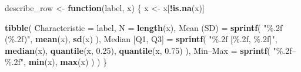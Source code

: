 \documentclass[
]{article}
\newenvironment{Shaded}{\begin{snugshade}}{\end{snugshade}}
\newcommand{\AttributeTok}[1]{\textcolor[rgb]{0.13,0.29,0.53}{#1}}
\newcommand{\ControlFlowTok}[1]{\textcolor[rgb]{0.13,0.29,0.53}{\textbf{#1}}}
\newcommand{\FloatTok}[1]{\textcolor[rgb]{0.00,0.00,0.81}{#1}}
\newcommand{\FunctionTok}[1]{\textcolor[rgb]{0.13,0.29,0.53}{\textbf{#1}}}
\newcommand{\NormalTok}[1]{#1}
\newcommand{\OtherTok}[1]{\textcolor[rgb]{0.56,0.35,0.01}{#1}}
\newcommand{\SpecialCharTok}[1]{\textcolor[rgb]{0.81,0.36,0.00}{\textbf{#1}}}
\newcommand{\StringTok}[1]{\textcolor[rgb]{0.31,0.60,0.02}{#1}}
\begin{document}
\begin{Shaded}
\begin{Highlighting}[]
\NormalTok{describe\_row }\OtherTok{\textless{}{-}} \ControlFlowTok{function}\NormalTok{(label, x) \{}
\NormalTok{  x }\OtherTok{\textless{}{-}}\NormalTok{ x[}\SpecialCharTok{!}\FunctionTok{is.na}\NormalTok{(x)]}

  \FunctionTok{tibble}\NormalTok{(}
    \AttributeTok{Characteristic =}\NormalTok{ label,}
    \AttributeTok{N =} \FunctionTok{length}\NormalTok{(x),}
    \StringTok{\textasciigrave{}}\AttributeTok{Mean (SD)}\StringTok{\textasciigrave{}} \OtherTok{=} \FunctionTok{sprintf}\NormalTok{(}
      \StringTok{"\%.2f (\%.2f)"}\NormalTok{, }\FunctionTok{mean}\NormalTok{(x), }\FunctionTok{sd}\NormalTok{(x)}
\NormalTok{    ),}
    \StringTok{\textasciigrave{}}\AttributeTok{Median [Q1, Q3]}\StringTok{\textasciigrave{}} \OtherTok{=} \FunctionTok{sprintf}\NormalTok{(}
      \StringTok{"\%.2f [\%.2f, \%.2f]"}\NormalTok{,}
      \FunctionTok{median}\NormalTok{(x),}
      \FunctionTok{quantile}\NormalTok{(x, }\FloatTok{0.25}\NormalTok{),}
      \FunctionTok{quantile}\NormalTok{(x, }\FloatTok{0.75}\NormalTok{)}
\NormalTok{    ),}
    \StringTok{\textasciigrave{}}\AttributeTok{Min–Max}\StringTok{\textasciigrave{}} \OtherTok{=} \FunctionTok{sprintf}\NormalTok{(}
      \StringTok{"\%.2f–\%.2f"}\NormalTok{, }\FunctionTok{min}\NormalTok{(x), }\FunctionTok{max}\NormalTok{(x)}
\NormalTok{    )}
\NormalTok{  )}
\NormalTok{\}}
\end{Highlighting}
\end{Shaded}
\end{document}
